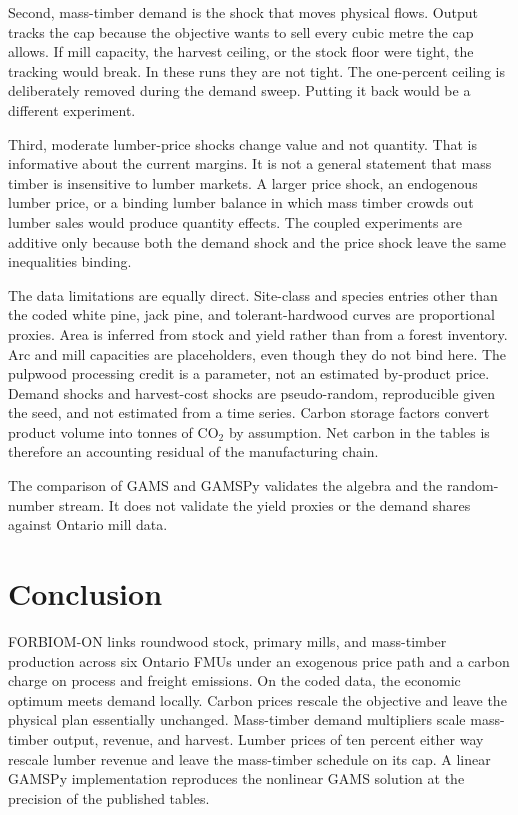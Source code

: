 \documentclass[11pt]{article}
\begin{document}
Second, mass-timber demand is the shock that moves physical flows. Output tracks the cap because the objective wants to sell every cubic metre the cap allows. If mill capacity, the harvest ceiling, or the stock floor were tight, the tracking would break. In these runs they are not tight. The one-percent ceiling is deliberately removed during the demand sweep. Putting it back would be a different experiment.

Third, moderate lumber-price shocks change value and not quantity. That is informative about the current margins. It is not a general statement that mass timber is insensitive to lumber markets. A larger price shock, an endogenous lumber price, or a binding lumber balance in which mass timber crowds out lumber sales would produce quantity effects. The coupled experiments are additive only because both the demand shock and the price shock leave the same inequalities binding.

The data limitations are equally direct. Site-class and species entries other than the coded white pine, jack pine, and tolerant-hardwood curves are proportional proxies. Area is inferred from stock and yield rather than from a forest inventory. Arc and mill capacities are placeholders, even though they do not bind here. The pulpwood processing credit is a parameter, not an estimated by-product price. Demand shocks and harvest-cost shocks are pseudo-random, reproducible given the seed, and not estimated from a time series. Carbon storage factors convert product volume into tonnes of CO$_2$ by assumption. Net carbon in the tables is therefore an accounting residual of the manufacturing chain.

The comparison of GAMS and GAMSPy validates the algebra and the random-number stream. It does not validate the yield proxies or the demand shares against Ontario mill data.

\section{Conclusion}

FORBIOM-ON links roundwood stock, primary mills, and mass-timber production across six Ontario FMUs under an exogenous price path and a carbon charge on process and freight emissions. On the coded data, the economic optimum meets demand locally. Carbon prices rescale the objective and leave the physical plan essentially unchanged. Mass-timber demand multipliers scale mass-timber output, revenue, and harvest. Lumber prices of ten percent either way rescale lumber revenue and leave the mass-timber schedule on its cap. A linear GAMSPy implementation reproduces the nonlinear GAMS solution at the precision of the published tables.
\end{document}
